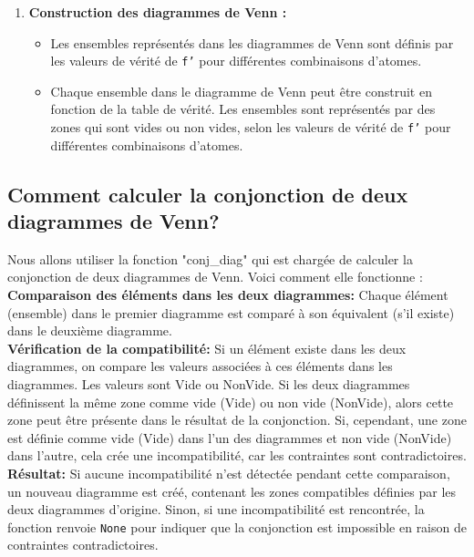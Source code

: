 \documentclass{article}
\begin{document}
\begin{enumerate}
    \item \textbf{Construction des diagrammes de Venn :}
    \begin{itemize}
        \item Les ensembles représentés dans les diagrammes de Venn sont définis par les valeurs de vérité de \texttt{f'} pour différentes combinaisons d'atomes.
        \item Chaque ensemble dans le diagramme de Venn peut être construit en fonction de la table de vérité. Les ensembles sont représentés par des zones qui sont vides ou non vides, selon les valeurs de vérité de \texttt{f'} pour différentes combinaisons d'atomes.
    \end{itemize}
\end{enumerate}

\newpage
\subsection{\textbf{Comment calculer la conjonction de deux diagrammes de Venn?}}
Nous allons utiliser la fonction "conj\_diag" qui est chargée de calculer la conjonction de deux diagrammes de Venn. Voici comment elle fonctionne :\\

\textbf{Comparaison des éléments dans les deux diagrammes:} Chaque élément (ensemble) dans le premier diagramme est comparé à son équivalent (s'il existe) dans le deuxième diagramme.\\

\textbf{Vérification de la compatibilité:} Si un élément existe dans les deux diagrammes, on compare les valeurs associées à ces éléments dans les diagrammes. Les valeurs sont Vide ou NonVide. Si les deux diagrammes définissent la même zone comme vide (Vide) ou non vide (NonVide), alors cette zone peut être présente dans le résultat de la conjonction. Si, cependant, une zone est définie comme vide (Vide) dans l'un des diagrammes et non vide (NonVide) dans l'autre, cela crée une incompatibilité, car les contraintes sont contradictoires.\\

\textbf{Résultat:} Si aucune incompatibilité n'est détectée pendant cette comparaison, un nouveau diagramme est créé, contenant les zones compatibles définies par les deux diagrammes d'origine. Sinon, si une incompatibilité est rencontrée, la fonction renvoie \texttt{None} pour indiquer que la conjonction est impossible en raison de contraintes contradictoires.\\
\end{document}

